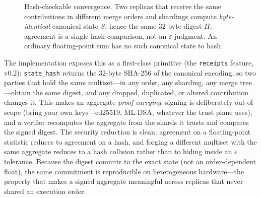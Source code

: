 \documentclass[11pt]{article}
\begin{document}
\begin{figure}[t]
\centering
{}
\caption{Hash-checkable convergence. Two replicas that receive the same contributions in different
merge orders and shardings compute \emph{byte-identical} canonical state $S$, hence the same $32$-byte
digest $H$; agreement is a single hash comparison, not an $\varepsilon$ judgment. An ordinary
floating-point sum has no such canonical state to hash.}
\label{fig:convergence}
\end{figure}

The implementation exposes this as a first-class primitive (the \texttt{receipts} feature, v0.2):
\texttt{state\_hash} returns the $32$-byte SHA-256 of the canonical encoding, so two parties that hold the
same multiset---in any order, any sharding, any merge tree---obtain the same digest, and any dropped,
duplicated, or altered contribution changes it. This makes an aggregate \emph{proof-carrying}: signing
is deliberately out of scope (bring your own keys---ed25519, ML-DSA, whatever the trust plane uses), and
a verifier recomputes the aggregate from the shards it trusts and compares the signed digest. The
security reduction is clean: agreement on a floating-point statistic reduces to agreement on a hash, and
forging a different multiset with the same aggregate reduces to a hash collision rather than to hiding
inside an $\varepsilon$ tolerance. Because the digest commits to the exact state (not an
order-dependent float), the same commitment is reproducible on heterogeneous hardware---the property that
makes a signed aggregate meaningful across replicas that never shared an execution order.
\end{document}
